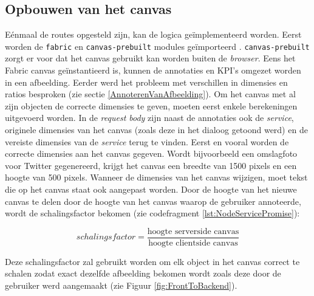 \subsection{Opbouwen van het canvas} \label{OpbouwenCanvas}
E\'{e}nmaal de routes opgesteld zijn, kan de logica ge\"{i}mplementeerd worden. Eerst worden de \texttt{fabric} en \texttt{canvas-prebuilt} modules ge\"{i}mporteerd \cite{CanvasPrebuilt}. \texttt{canvas-prebuilt} zorgt er voor dat het canvas gebruikt kan worden buiten de \textit{browser}. Eens het Fabric canvas ge\"{i}nstantieerd is, kunnen de annotaties en KPI's omgezet worden in een afbeelding. Eerder werd het probleem met verschillen in dimensies en ratios besproken (zie sectie \ref{AnnoterenVanAfbeelding}). Om het canvas met al zijn objecten de correcte dimensies te geven, moeten eerst enkele berekeningen uitgevoerd worden. In de \textit{request body} zijn naast de annotaties ook de \textit{service}, originele dimensies van het canvas (zoals deze in het dialoog getoond werd) en de vereiste dimensies van de \textit{service} terug te vinden. Eerst en vooral worden de correcte dimensies aan het canvas gegeven. Wordt bijvoorbeeld een omslagfoto voor Twitter gegenereerd, krijgt het canvas een breedte van 1500 pixels en een hoogte van 500 pixels. Wanneer de dimensies van het canvas wijzigen, moet tekst die op het canvas staat ook aangepast worden. Door de hoogte van het nieuwe canvas te delen door de hoogte van het canvas waarop de gebruiker annoteerde, wordt de schalingsfactor bekomen (zie codefragment \ref{lst:NodeServicePromise}):  

\[ schalingsfactor = \frac{\text{hoogte serverside canvas}}{\text{hoogte clientside canvas}} \]

Deze schalingsfactor zal gebruikt worden om elk object in het canvas correct te schalen zodat exact dezelfde afbeelding bekomen wordt zoals deze door de gebruiker werd aangemaakt (zie Figuur \ref{fig:FrontToBackend}).

